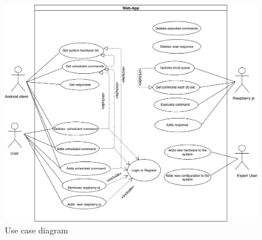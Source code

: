 \documentclass[12pt, oneside, a4paper]{book}
\begin{document}
					\begin{figure}[H]
					\includegraphics[width=\linewidth]{img/diagram_usecase.png}
					\caption{Use case diagram}
					\label{fig:diagram_usecase}
					\end{figure}
				
\end{document}
